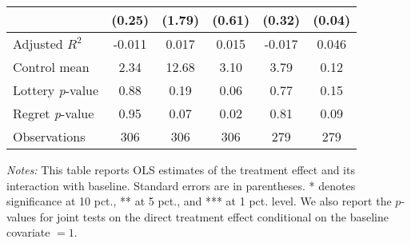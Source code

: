 \begin{table}[htbp]
{\begin{threeparttable}
\begin{tabular}{l*{5}{c}}
                &   (0.25)         &   (1.79)         &   (0.61)         &   (0.32)         &   (0.04)         \\
\midrule
Adjusted \(R^{2}\)&   -0.011         &    0.017         &    0.015         &   -0.017         &    0.046         \\
Control mean    &     2.34         &    12.68         &     3.10         &     3.79         &     0.12         \\
Lottery \emph{p}-value&     0.88         &     0.19         &     0.06         &     0.77         &     0.15         \\
Regret \emph{p}-value&     0.95         &     0.07         &     0.02         &     0.81         &     0.09         \\
Observations    &      306         &      306         &      306         &      279         &      279         \\
\bottomrule \end{tabular} \begin{tablenotes}[flushleft] \footnotesize \item \emph{Notes:} This table reports OLS estimates of the treatment effect and its interaction with baseline. Standard errors are in parentheses. * denotes significance at 10 pct., ** at 5 pct., and *** at 1 pct. level. We also report the \(p\)-values for joint tests on the direct treatment effect conditional on the baseline covariate $= 1$. \end{tablenotes} \end{threeparttable} } \end{table}
